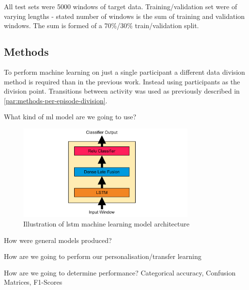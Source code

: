 All test sets were 5000 windows of target data. Training/validation set were of varying lengths - stated number of windows is the sum of training and validation windows. The sum is formed of a 70\%/30\% train/validation split.


\subsection{ Methods} 
To perform machine learning on just a single participant a different data division method is required than in the previous work. Instead using participants as the division point. Transitions between activity was used as previously described in \ref{par:methods-per-episode-division}.

What kind of \acrshort{ml} model are we going to use?
\begin{figure}[htbp]
    \centering
    \includegraphics[width=0.8\textwidth]{content/5-Personalisation/ch5_lstm_architecture.pdf}
    \caption[Illustration of  machine learning model architecture]{Illustration of \acrshort{lstm} machine learning model architecture}
    \label{fig:ch5_illustration_of_base_LSTM_model}
\end{figure}

How were general models produced?

How are we going to perform our personalisation/transfer learning

How are we going to determine performance? Categorical accuracy, Confusion Matrices, F1-Scores


